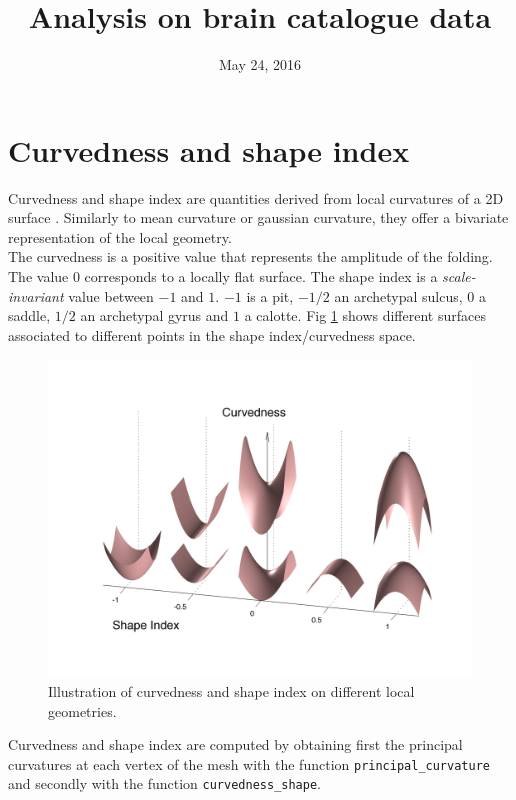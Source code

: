 \documentclass[a4paper, oneside, 12pt, onecolumn]{article}
\title{Analysis on brain catalogue data}
\date{May 24, 2016}
\begin{document}
%
\maketitle
%

\section{Curvedness and shape index}

Curvedness and shape index are quantities derived from local curvatures of a 2D surface \cite{koenderink1987representation}. Similarly to mean curvature or gaussian curvature, they offer a bivariate representation of the local geometry.\\
The curvedness is a positive value that represents the amplitude of the folding. The value $0$ corresponds to a locally flat surface. The shape index is a \emph{scale-invariant} value between $-1$ and $1$. $-1$ is a pit, $-1/2$ an archetypal sulcus, $0$ a saddle, $1/2$ an archetypal gyrus and $1$ a calotte. Fig \ref{Fig1} shows different surfaces associated to different points in the shape index/curvedness space.\\

\begin{figure}
\includegraphics[width=\linewidth]{Figs/SI_C_scheme.png}
\caption{Illustration of curvedness and shape index on different local geometries.}
\label{Fig1}
\end{figure}

Curvedness and shape index are computed by obtaining first the principal curvatures at each vertex of the mesh with the function \texttt{principal\_curvature} and secondly with the function \texttt{curvedness\_shape}.
\end{document}
